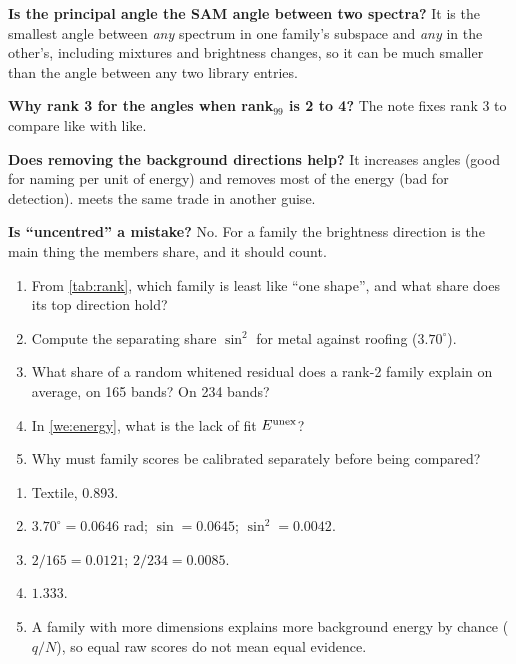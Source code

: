 \documentclass[11pt,a4paper,oneside,openany]{book}
\begin{document}
\begin{confusions}
\textbf{Is the principal angle the SAM angle between two spectra?} It is the smallest angle between \emph{any} spectrum in one family's subspace and
\emph{any} in the other's, including mixtures and brightness changes, so it can be much smaller than the angle between any two library entries.

\textbf{Why rank 3 for the angles when rank$_{99}$ is 2 to 4?} The note fixes rank 3 to compare like with like.

\textbf{Does removing the background directions help?} It increases angles (good for naming per unit of energy) and removes most of the energy (bad
for detection).  meets the same trade in another guise.

\textbf{Is ``uncentred'' a mistake?} No. For a family the brightness direction is the main thing the members share, and it should count.
\end{confusions}

\begin{checkyourself}
\begin{enumerate}
\item From \cref{tab:rank}, which family is least like ``one shape'', and what share does its top direction hold?
\item Compute the separating share $\sin^2$ for metal against roofing ($3.70^\circ$).
\item What share of a random whitened residual does a rank-2 family explain on average, on 165 bands? On 234 bands?
\item In \cref{we:energy}, what is the lack of fit $E^{\rm unex}$?
\item Why must family scores be calibrated separately before being compared?
\end{enumerate}
\end{checkyourself}

\begin{answers}
\begin{enumerate}
\item Textile, 0.893.
\item $3.70^\circ=0.0646$ rad; $\sin=0.0645$; $\sin^2=0.0042$.
\item $2/165=0.0121$; $2/234=0.0085$.
\item $1.333$.
\item A family with more dimensions explains more background energy by chance ($q/N$), so equal raw scores do not mean equal evidence.
\end{enumerate}
\end{answers}
\end{document}
